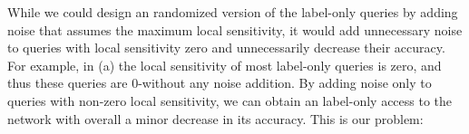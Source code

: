 While we could design an \propi randomized version of the label-only queries by adding noise that assumes the maximum local sensitivity, it would add unnecessary noise to queries with local sensitivity zero and unnecessarily decrease their accuracy. 
For example, in (a) the local sensitivity of most label-only queries is zero, and thus these queries are 0-\propi without any noise addition. By adding noise only to queries with non-zero local sensitivity, we can obtain an \propi label-only access to the network with overall a minor decrease in its accuracy.
This is our problem:
 


